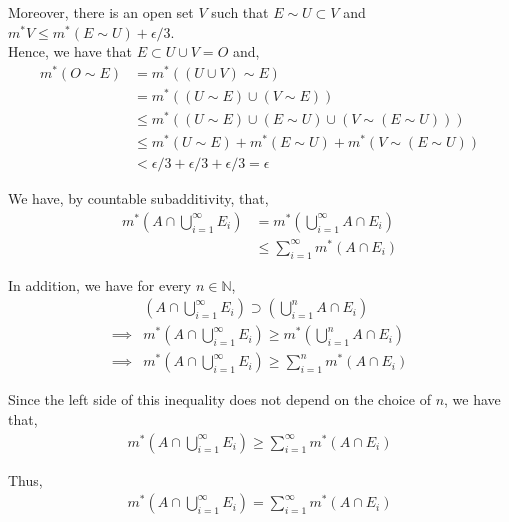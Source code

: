 \documentclass[12pt]{article}
\newenvironment{problem}[2][Problem]{\begin{trivlist}
\item[\hskip \labelsep {\bfseries #1}\hskip \labelsep {\bfseries #2.}]}{\end{trivlist}}
\begin{document}
Moreover, there is an open set $V$ such that $E \sim U \subset V$ and $m^*V \leq m^*(E \sim U) + \epsilon/3$.\\

Hence, we have that $E \subset U \cup V = O$ and,
\begin{align*}
m^*(O \sim E) &= m^*((U \cup V) \sim E)\\
&= m^*((U \sim E) \cup (V \sim E))\\
&\leq m^*((U \sim E) \cup (E \sim U) \cup (V \sim (E \sim U)))\\
&\leq m^*(U \sim E) + m^*(E \sim U) + m^*(V \sim (E \sim U))\\
&< \epsilon/3 + \epsilon/3 + \epsilon/3 = \epsilon
\end{align*}

\begin{problem}{3}
\end{problem}

We have, by countable subadditivity, that,
\begin{align*}
m^*\left(A \cap \bigcup_{i=1}^{\infty} E_i\right) &= m^*\left(\bigcup_{i=1}^{\infty} A \cap E_i\right)\\
&\leq \sum_{i=1}^{\infty} m^*(A \cap E_i)
\end{align*}

In addition, we have for every $n \in \mathbb{N}$,
\begin{align*}
&\left(A \cap \bigcup_{i=1}^{\infty} E_i\right) \supset \left(\bigcup_{i=1}^{n} A \cap E_i\right)\\
\implies &m^*\left(A \cap \bigcup_{i=1}^{\infty} E_i\right) \geq m^*\left(\bigcup_{i=1}^{n} A \cap E_i\right)\\
\implies &m^*\left(A \cap \bigcup_{i=1}^{\infty} E_i\right) \geq \sum_{i=1}^{n} m^*(A \cap E_i)
\end{align*}

Since the left side of this inequality does not depend on the choice of $n$, we have that, 
\begin{align*}
m^*\left(A \cap \bigcup_{i=1}^{\infty} E_i\right) \geq \sum_{i=1}^{\infty} m^*(A \cap E_i)
\end{align*}

Thus,
\begin{align*}
m^*\left(A \cap \bigcup_{i=1}^{\infty} E_i\right) = \sum_{i=1}^{\infty} m^*(A \cap E_i)
\end{align*}

\begin{problem}{4}
\end{problem}
\end{document}
